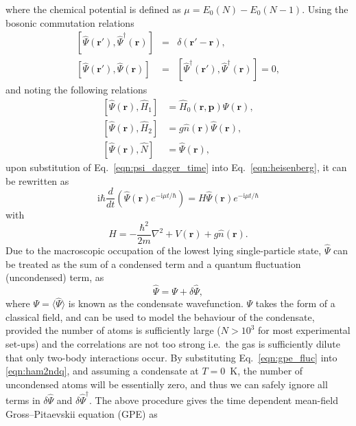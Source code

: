 where the chemical potential is defined as $\mu=E_0(N) - E_0(N-1)$. Using the bosonic commutation relations
\begin{eqnarray}
\left[\hat{\Psi}(\mathbf{r}'), \hat{\Psi}^{\dagger}(\mathbf{r})\right] &=& \delta(\mathbf{r}' - \mathbf{r}), \\
\left[\hat{\Psi}(\mathbf{r}'), \hat{\Psi}(\mathbf{r})\right] &=& \left[\hat{\Psi}^{\dagger}(\mathbf{r}'), \hat{\Psi}^{\dagger}(\mathbf{r})\right] = 0,
\end{eqnarray}
and noting the following relations
\begin{align}
\left[\hat{\Psi}(\mathbf{r}),\hat{H}_1 \right] & = \hat{H}_0(\mathbf{r},\mathbf{p})\hat{\Psi}(\mathbf{r}), \\
\left[\hat{\Psi}(\mathbf{r}),\hat{H}_2 \right] & = g\hat{n}(\textbf{r})\hat{\Psi}(\mathbf{r}), \\
\left[\hat{\Psi}(\mathbf{r}),\hat{N} \right] & = \hat{\Psi}(\textbf{r}) ,
\end{align}
upon substitution of Eq.~\eqref{eqn:psi_dagger_time} into Eq.~\eqref{eqn:heisenberg}, it can be rewritten as
\begin{equation}\label{eqn:almost_gpe}
    \textrm{i} \hbar \frac{d}{d t} \left( \hat{\Psi}(\mathbf{r}) e^{-{\textrm{i}\mu t / \hbar}} \right) = H \hat{\Psi}(\mathbf{r}) e^{-{\textrm{i}\mu t / \hbar}}
\end{equation}
with
\begin{equation}\label{eqn:h_many}
H =  -\frac{\hbar^2}{2m}\nabla^2  + V(\mathbf{r}) + g\hat{n}(\mathbf{r}).
\end{equation}
Due to the macroscopic occupation of the lowest lying single-particle state, $\hat{\Psi}$ can be treated as the sum of a condensed term and a quantum fluctuation (uncondensed) term, as
\begin{equation}\label{eqn:gpe_fluc}
    \hat{\Psi} = \Psi + \delta\hat{\Psi},
\end{equation}
where $\Psi = \langle \hat{\Psi} \rangle$ is known as the condensate wavefunction. $\Psi$ takes the form of a classical field, and can be used to model the behaviour of the condensate, provided the number of atoms is sufficiently large ($N>10^3$ for most experimental set-ups) and the correlations are not too strong i.e.\ the gas is sufficiently dilute that only two-body interactions occur. By substituting Eq.~\eqref{eqn:gpe_fluc} into \eqref{eqn:ham2ndq}, and assuming a condensate at $T=0$~K, the number of uncondensed atoms will be essentially zero, and thus we can safely ignore all terms in $\delta\hat{\Psi}$ and $\delta\hat{\Psi}^{\dagger}$. The above procedure gives the time dependent mean-field Gross--Pitaevskii equation (GPE) as

